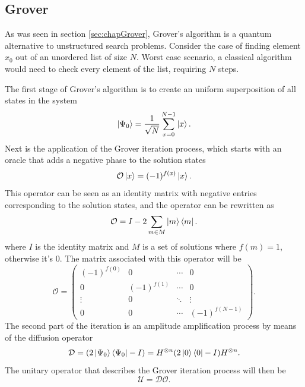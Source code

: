 \documentclass[../../dissertation.tex]{subfiles}
\begin{document}
\subsection{Grover}
As was seen in section \ref{sec:chapGrover}, Grover's algorithm is a quantum
alternative to unstructured search problems. Consider the case of finding
element $x_0$ out of an unordered list of size $N$. Worst case scenario, a
classical algorithm would need to check every element of the list, requiring
$N$ steps.\par

The first stage of Grover's algorithm is to create an uniform superposition of
all states in the system
\begin{equation}
	\ket{\Psi_0}  = \frac{1}{\sqrt{N}}\sum_{x=0}^{N-1} \ket{x}.
\end{equation}
Next is the application of the Grover iteration process, which starts with an
oracle that adds a negative phase to the solution states
\begin{equation}
        \mathcal{O}\ket{x} = (-1)^{f(x)}\ket{x}.
\end{equation}
This operator can be seen as an identity matrix with negative entries
corresponding to the solution states, and the operator can be rewritten as 
\begin{equation}
	\mathcal{O} = I - 2\sum_{m\in M} \ket{m}\bra{m}.
	\label{eq:groverQiskitOracle}
\end{equation}
where $I$ is the identity matrix and $M$ is a set of solutions where $f(m) =
1$, otherwise it's $0$. The matrix associated with this operator will be
\begin{equation}
	\mathcal{O} = 
	\begin{pmatrix}
		(-1)^{f(0)} & 0 & \cdots & 0\\
	        0 & (-1)^{f(1)} & \cdots & 0\\ 
	        \vdots & 0 &  \ddots & \vdots\\ 
		0 & 0 & \cdots &  (-1)^{f(N-1)}
	\end{pmatrix}.
	\label{eq:oracleMatrixQiskit}
\end{equation}
The second part of the iteration is an amplitude amplification process by means
of the diffusion operator 
\begin{equation}
        \mathcal{D} = (2\ket{\Psi_0}\bra{\Psi_0} - I) = H^{\otimes n}(2\ket{0}\bra{0} - I)H^{\otimes n}.
	\label{eq:groverQiskitDiffusion}
\end{equation}
The unitary operator that describes the Grover iteration process will then be
\begin{equation}
        \mathcal{U} = \mathcal{D}\mathcal{O}.
\end{equation}\par
\end{document}
